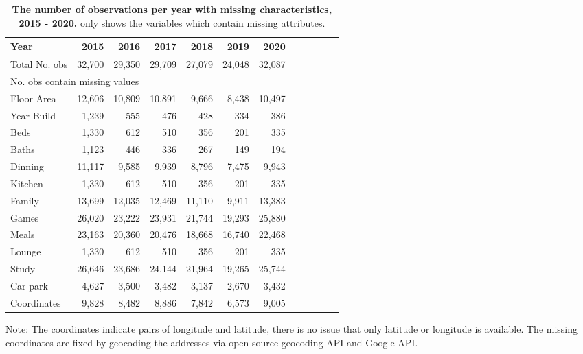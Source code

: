 \begin{table}[ht]
\centering
\caption{{\bf The number of observations per year with missing characteristics, 2015 - 2020.} only shows the variables which contain missing attributes.\setlength{\baselineskip}{1.25em}}
\label{tab_summary_missing_values}
\setlength{\baselineskip}{1.25em}
\begin{threeparttable}
\begin{tabular}{lrrrrrrrrrrr}
\toprule\toprule
Year          &2015   &2016   &2017   &2018   &2019   &2020\\
\midrule
Total No. obs &32,700 &29,350 &29,709 &27,079 &24,048 &32,087\\
\midrule
\multicolumn{4}{l}{No. obs contain missing values}\\
Floor Area   &12,606  &10,809 &10,891 &9,666  &8,438  &10,497\\
Year Build   &1,239   &555    &476    &428    &334    &386\\
Beds         &1,330   &612    &510    &356    &201    &335\\
Baths        &1,123   &446    &336    &267    &149    &194\\
Dinning      &11,117  &9,585  &9,939  &8,796  &7,475  &9,943\\
Kitchen      &1,330   &612    &510    &356    &201    &335\\
Family       &13,699  &12,035 &12,469 &11,110 &9,911  &13,383\\
Games        &26,020  &23,222 &23,931 &21,744 &19,293 &25,880\\
Meals        &23,163  &20,360 &20,476 &18,668 &16,740 &22,468\\
Lounge       &1,330   &612    &510    &356    &201    &335\\
Study        &26,646  &23,686 &24,144 &21,964 &19,265 &25,744\\
Car park     &4,627   &3,500  &3,482  &3,137  &2,670  &3,432\\
Coordinates  &9,828   &8,482  &8,886  &7,842  &6,573  &9,005\\
\bottomrule\bottomrule
\end{tabular}
Note: The coordinates indicate pairs of longitude and latitude, there is no issue that only latitude or longitude is available. The missing coordinates are fixed by geocoding the addresses via open-source geocoding API and Google API.\setlength{\baselineskip}{1.25em}
\end{threeparttable}
\end{table}